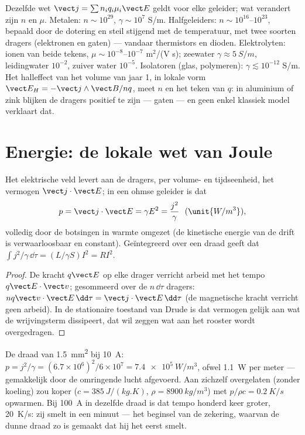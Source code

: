 \begin{remark}\label{rem:b2:charges-currents-conduction:materials}
Dezelfde wet $\vect j = \sum n_iq_i\mu_i\vect E$ geldt voor elke geleider;
wat verandert zijn $n$ en $\mu$. Metalen: $n \sim 10^{29}$,
$\gamma \sim 10^7$ S/m. Halfgeleiders: $n \sim 10^{16}$--$10^{23}$, bepaald
door de dotering en steil stijgend met de temperatuur, met twee soorten
dragers (elektronen en gaten) --- vandaar thermistors en dioden.
Elektrolyten: ionen van beide tekens, $\mu \sim 10^{-8}$--$10^{-7}$ m$^2$/(V
s); zeewater $\gamma \approx \qty{5}{S/m}$, leidingwater $10^{-2}$, zuiver
water $10^{-5}$. Isolatoren (glas, polymeren): $\gamma \lesssim 10^{-12}$
S/m. Het halleffect van het volume van jaar 1, in lokale vorm
$\vect E_H = -\vect j\wedge\vect B/nq$, meet $n$ en het teken van $q$: in
aluminium of zink blijken de dragers positief te zijn --- gaten --- en geen
enkel klassiek model verklaart dat.
\end{remark}

\section{Energie: de lokale wet van Joule}

\begin{proposition}\label{prop:b2:charges-currents-conduction:joule}
Het elektrische veld levert aan de dragers, per volume- en tijdseenheid, het
vermogen $\vect j\cdot\vect E$; in een ohmse geleider is dat
\[
p = \vect j\cdot\vect E = \gamma E^2 = \frac{j^2}\gamma \ \ (\unit{W/m^3}) ,
\]
volledig door de botsingen in warmte omgezet (de kinetische energie van de
drift is verwaarloosbaar en constant). Geïntegreerd over een draad geeft dat
$\int j^2/\gamma\,\dd\tau
= (L/\gamma S)I^2 = RI^2$.
\end{proposition}

\begin{proof}
De kracht $q\vect E$ op elke drager verricht arbeid met het tempo
$q\vect E\cdot\vect v$; gesommeerd over de $n\,\dd\tau$ dragers:
$nq\vect v\cdot\vect E\,\dd\tau = \vect j\cdot
\vect E\,\dd\tau$ (de
magnetische kracht verricht geen arbeid). In de stationaire toestand van
Drude is dat vermogen gelijk aan wat de wrijvingsterm dissipeert, dat wil
zeggen wat aan het rooster wordt overgedragen.
\end{proof}

\begin{example}\label{ex:b2:charges-currents-conduction:heating}
De draad van \qty{1.5}{mm^2} bij \qty{10}{A}:
$p = j^2/\gamma = (6.7 \times 10^6)^2/6 \times 10^7 =
\qty{7.4e5}{W/m^3}$,
ofwel \qty{1.1}{W} per meter --- gemakkelijk door de omringende lucht
afgevoerd. Aan zichzelf overgelaten (zonder koeling) zou koper
($c = \qty{385}{J/(kg.K)}$, $\rho = \qty{8900}{kg/m^3}$) met
$p/\rho c = \qty{0.2}{K/s}$ opwarmen. Bij \qty{100}{A} in dezelfde draad is
dat tempo honderd keer groter, \qty{20}{K/s}: zij smelt in een minuut ---
het beginsel van de zekering, waarvan de dunne draad zo is gemaakt dat hij
het eerst smelt.
\end{example}

